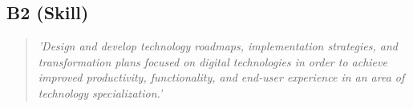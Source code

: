 \subsection{B2 (Skill)}

  \begin{quote}
    \textit{'Design and develop technology roadmaps,
    implementation strategies, and transformation plans
    focused on digital technologies in order to achieve
    improved productivity, functionality, and end-user
    experience in an area of technology specialization.'}
  \end{quote}

\newpage